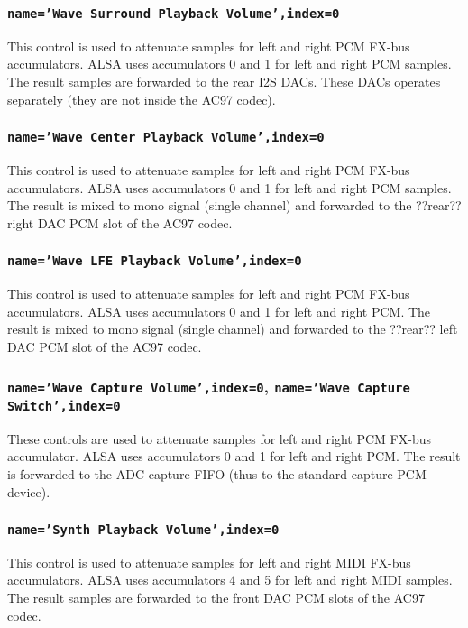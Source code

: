 \documentclass[a4paper,8pt,english]{sphinxmanual}
\begin{document}
\subsubsection{\texttt{name='Wave Surround Playback Volume',index=0}}
\label{sound/cards/sb-live-mixer:name-wave-surround-playback-volume-index-0}
This control is used to attenuate samples for left and right PCM FX-bus
accumulators. ALSA uses accumulators 0 and 1 for left and right PCM samples.
The result samples are forwarded to the rear I2S DACs. These DACs operates
separately (they are not inside the AC97 codec).


\subsubsection{\texttt{name='Wave Center Playback Volume',index=0}}
\label{sound/cards/sb-live-mixer:name-wave-center-playback-volume-index-0}
This control is used to attenuate samples for left and right PCM FX-bus
accumulators. ALSA uses accumulators 0 and 1 for left and right PCM samples.
The result is mixed to mono signal (single channel) and forwarded to
the ??rear?? right DAC PCM slot of the AC97 codec.


\subsubsection{\texttt{name='Wave LFE Playback Volume',index=0}}
\label{sound/cards/sb-live-mixer:name-wave-lfe-playback-volume-index-0}
This control is used to attenuate samples for left and right PCM FX-bus
accumulators. ALSA uses accumulators 0 and 1 for left and right PCM.
The result is mixed to mono signal (single channel) and forwarded to
the ??rear?? left DAC PCM slot of the AC97 codec.


\subsubsection{\texttt{name='Wave Capture Volume',index=0}, \texttt{name='Wave Capture Switch',index=0}}
\label{sound/cards/sb-live-mixer:name-wave-capture-volume-index-0-name-wave-capture-switch-index-0}
These controls are used to attenuate samples for left and right PCM FX-bus
accumulator. ALSA uses accumulators 0 and 1 for left and right PCM.
The result is forwarded to the ADC capture FIFO (thus to the standard capture
PCM device).


\subsubsection{\texttt{name='Synth Playback Volume',index=0}}
\label{sound/cards/sb-live-mixer:name-synth-playback-volume-index-0}
This control is used to attenuate samples for left and right MIDI FX-bus
accumulators. ALSA uses accumulators 4 and 5 for left and right MIDI samples.
The result samples are forwarded to the front DAC PCM slots of the AC97 codec.
\end{document}
